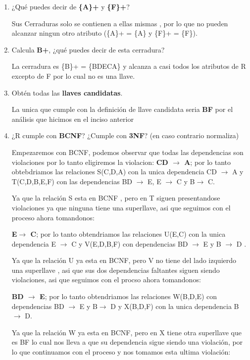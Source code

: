 \documentclass[a4paper, 12pt]{report}
\begin{document}
\begin{enumerate}
\begin{enumerate}
	\item ¿Qué puedes decir de \textbf{\{A\}+} y \textbf{\{F\}+}?

Sus Cerraduras solo se contienen a ellas mismas , por lo que no pueden alcanzar ningun otro atributo (\{A\}+ = \{A\} y \{F\}+ = \{F\}).

	\item Calcula \textbf{{B}+}, ¿qué puedes decir de esta cerradura?

	La cerradura es \{B\}+ = \{BDECA\} y alcanza a casi todos los atributos de R excepto de F por lo cual no es una llave.

	\item Obtén todas las \textbf{llaves candidatas}.

	La unica que cumple con la definición de llave candidata seria \textbf{BF} por el análisis que hicimos en el inciso anterior

	\item ¿R cumple con \textbf{BCNF}? ¿Cumple con \textbf{3NF}? (en caso contrario normaliza)

	Empezaremos con BCNF, podemos observar que todas las dependencias son violaciones por lo tanto eligiremos la violacion:  \textbf{CD $\rightarrow$ A};
	por lo tanto obtebdriamos las relaciones S(C,D,A) con la unica dependencia CD $\rightarrow$ A y T(C,D,B,E,F) con las dependencias BD $\rightarrow$ E, E $\rightarrow$ C y B$\rightarrow$ C.

	Ya que la relación S esta en BCNF , pero en T siguen presentandose violaciones ya que ninguna tiene una superllave, asi que seguimos con el proceso ahora tomandonos:

	\textbf{E$\rightarrow$ C};
	por lo tanto obtendriamos las relaciones U(E,C) con la unica dependencia E $\rightarrow	$ C y V(E,D,B,F) con dependencias BD $\rightarrow$ E y B $\rightarrow$ D .

	Ya que la relación U ya esta en BCNF, pero V no tiene del lado izquierdo una superllave , asi que sus dos dependencias faltantes siguen siendo violaciones, asi que seguimos con el procso ahora tomandonos:

	\textbf{BD $\rightarrow$ E};
	por lo tanto obtendriamos las relaciones W(B,D,E) con dependencias BD $\rightarrow$ E y B$\rightarrow$ D y X(B,D,F) con la unica dependencia B$\rightarrow$ D.

	Ya que la relación W ya esta en BCNF, pero en X tiene otra superllave que es BF lo cual nos lleva a que su dependencia sigue siendo una violación, por lo que continuamos con el proceso y nos tomamos esta ultima violación:


\end{enumerate}
\end{enumerate}
\end{document}
